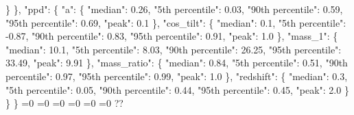 {{        \}%
      \}, %
      "ppd": \{%
        "a": \{%
          "median": 0.26, %
          "5th percentile": 0.03, %
          "90th percentile": 0.59, %
          "95th percentile": 0.69, %
          "peak": 0.1%
        \}, %
        "cos\_tilt": \{%
          "median": 0.1, %
          "5th percentile": {-}0.87, %
          "90th percentile": 0.83, %
          "95th percentile": 0.91, %
          "peak": 1.0%
        \}, %
        "mass\_1": \{%
          "median": 10.1, %
          "5th percentile": 8.03, %
          "90th percentile": 26.25, %
          "95th percentile": 33.49, %
          "peak": 9.91%
        \}, %
        "mass\_ratio": \{%
          "median": 0.84, %
          "5th percentile": 0.51, %
          "90th percentile": 0.97, %
          "95th percentile": 0.99, %
          "peak": 1.0%
        \}, %
        "redshift": \{%
          "median": 0.3, %
          "5th percentile": 0.05, %
          "90th percentile": 0.44, %
          "95th percentile": 0.45, %
          "peak": 2.0%
        \}%
      \}%
    \}}%
  \else%
    \ifnum{}=0%
      \def\MagTruncnormIidTiltIsotropicAlignedNid@out{%
    {-}1031.95}%
    \else%
      \ifnum{}=0%
      \def\MagTruncnormIidTiltIsotropicAlignedNid@out{%
    0.24}%
    \else%
      \ifnum{}=0%
      \def\MagTruncnormIidTiltIsotropicAlignedNid@out{%
    0.34}%
    \else%
      \ifnum{}=0%
      \def\MagTruncnormIidTiltIsotropicAlignedNid@out{%
    0.99}%
    \else%
      \ifnum{}=0%
      \let\MagTruncnormIidTiltIsotropicAlignedNid@out\MagTruncnormIidTiltIsotropicAlignedNid@I%
    \else%
      \ifnum{}=0%
      \let\MagTruncnormIidTiltIsotropicAlignedNid@out\MagTruncnormIidTiltIsotropicAlignedNid@II%
    \else%
      \def\MagTruncnormIidTiltIsotropicAlignedNid@out{%
    ??}%
    \fi\fi\fi\fi\fi\fi
  \fi
  \MagTruncnormIidTiltIsotropicAlignedNid@out
}\newcommand\MagTruncnormIidTiltIsotropicAlignedNid@I[1][all]{%
  \ifnum\pdfstrcmp{#1}{all}=0%
    \def\MagTruncnormIidTiltIsotropicAlignedNid@I@out{%
    \{%
      "alpha\_1": \{%
        "median": 1.88, %
        "5th percentile": {-}0.24, %
        "95th percentile": 3.21, %
        "error plus": 1.33, %
        "error minus": 2.11%
      \}, %
      "alpha\_2": \{%
        "median": 4.62, %
        "5th percentile": 3.18, %
        "95th percentile": 6.36, %
        "error plus": 1.73, %
        "error minus": 1.44%
      \}, %
      "beta": \{%
        "median": 1.57, %
}}

